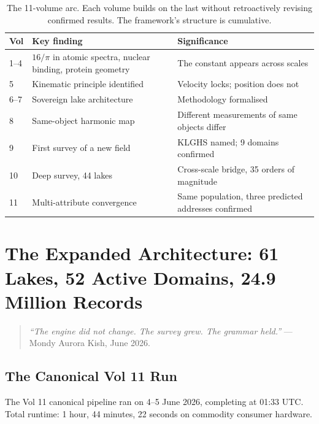 \documentclass[11pt, letterpaper, openany]{book}
\begin{document}
\begin{table}[H]
\centering
\renewcommand{\arraystretch}{1.4}
\small
\begin{tabular}{|l|l|p{7cm}|}
\hline
\rowcolor{kishblue!10}
\textbf{Vol} & \textbf{Key finding} & \textbf{Significance} \\
\hline\hline
1--4 & $16/\pi$ in atomic spectra, nuclear binding, protein geometry & The constant appears across scales \\
5 & Kinematic principle identified & Velocity locks; position does not \\
6--7 & Sovereign lake architecture & Methodology formalised \\
8 & Same-object harmonic map & Different measurements of same objects differ \\
9 & First survey of a new field & KLGHS named; 9 domains confirmed \\
10 & Deep survey, 44 lakes & Cross-scale bridge, 35 orders of magnitude \\
11 & Multi-attribute convergence & Same population, three predicted addresses confirmed \\
\hline
\end{tabular}
\caption{The 11-volume arc. Each volume builds on the last without retroactively
revising confirmed results. The framework's structure is cumulative.}
\label{tab:arc}
\end{table}

\clearpage

\chapter{The Expanded Architecture: 61 Lakes, 52 Active Domains, 24.9 Million Records}

\begin{quote}
\textit{``The engine did not change. The survey grew. The grammar held.''} ---
Mondy Aurora Kish, June 2026.
\end{quote}

\section{The Canonical Vol 11 Run}

The Vol 11 canonical pipeline ran on 4--5 June 2026, completing at 01:33 UTC.
Total runtime: 1 hour, 44 minutes, 22 seconds on commodity consumer hardware.
\end{document}
